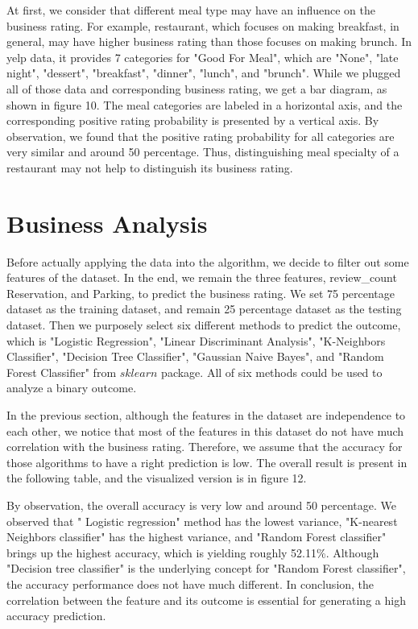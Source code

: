 \documentclass{article}
\begin{document}
At first, we consider that different meal type may have an influence on the business rating. For example, restaurant, which focuses on making breakfast, in general, may have higher business rating than those focuses on making brunch. In yelp data, it provides 7 categories for "Good For Meal", which are "None", "late night", "dessert", "breakfast", "dinner", "lunch", and "brunch". While we plugged all of those data and corresponding business rating, we get a bar diagram, as shown in figure 10. The meal categories are labeled in a horizontal axis, and the corresponding positive rating probability is presented by a vertical axis. By observation, we found that the positive rating probability for all categories are very similar and around 50 percentage. Thus, distinguishing meal specialty of a restaurant may not help to distinguish its business rating.

\section{Business Analysis}

Before actually applying the data into the algorithm, we decide to filter out some features of the dataset. In the end, we remain the three features, review\_count  Reservation, and Parking, to predict the business rating. We set 75 percentage dataset as the training dataset, and remain 25 percentage dataset as the testing dataset. Then we purposely select six different methods to predict the outcome, which is "Logistic Regression", "Linear Discriminant Analysis", "K-Neighbors Classifier", "Decision Tree Classifier", "Gaussian Naive Bayes", and "Random Forest Classifier" from $sklearn$ package. All of six methods could be used to analyze a binary outcome.

In the previous section, although the features in the dataset are independence to each other, we notice that most of the features in this dataset do not have much correlation with the business rating. Therefore, we assume that the accuracy for those algorithms to have a right prediction is low. The overall result is present in the following table, and the visualized version is in figure 12.

By observation, the overall accuracy is very low and around 50 percentage. We observed that " Logistic regression" method has the lowest variance, "K-nearest Neighbors classifier" has the highest variance, and "Random Forest classifier" brings up the highest accuracy, which is yielding roughly 52.11\%. Although "Decision tree classifier" is the underlying concept for "Random Forest classifier", the accuracy performance does not have much different.   In conclusion, the correlation between the feature and its outcome is essential for generating a high accuracy prediction.
\end{document}
